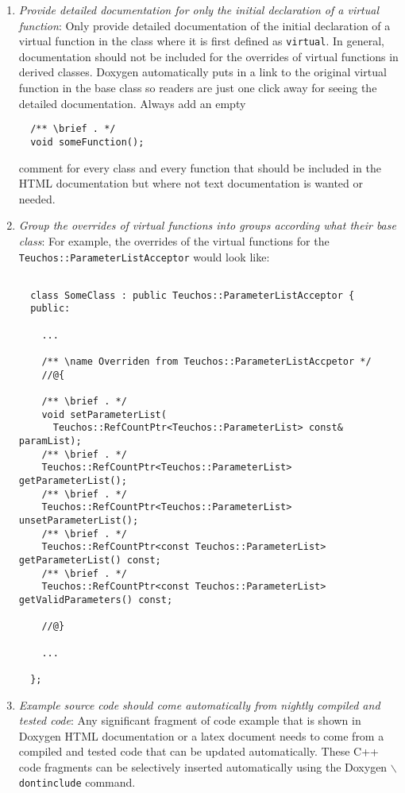 \begin{enumerate}
{}\item\textit{Provide detailed documentation for only the initial declaration
of a virtual function}: Only provide detailed documentation of the initial
declaration of a virtual function in the class where it is first defined as
{}\texttt{virtual}.  In general, documentation should not be included for the
overrides of virtual functions in derived classes.  Doxygen automatically puts
in a link to the original virtual function in the base class so readers are
just one click away for seeing the detailed documentation.  Always add an
empty
%
{\small\begin{verbatim}
  /** \brief . */
  void someFunction();
\end{verbatim}}
%
comment for every class and every function that should be included in the HTML
documentation but where not text documentation is wanted or needed.

{}\item\textit{Group the overrides of virtual functions into groups according
what their base class}: For example, the overrides of the virtual functions
for the {}\texttt{Teuchos\-::Parameter\-List\-Acceptor} would look like:

{\small\begin{verbatim}

  class SomeClass : public Teuchos::ParameterListAcceptor {
  public:

    ...

    /** \name Overriden from Teuchos::ParameterListAccpetor */
    //@{

    /** \brief . */
    void setParameterList(
      Teuchos::RefCountPtr<Teuchos::ParameterList> const& paramList);
    /** \brief . */
    Teuchos::RefCountPtr<Teuchos::ParameterList> getParameterList();
    /** \brief . */
    Teuchos::RefCountPtr<Teuchos::ParameterList> unsetParameterList();
    /** \brief . */
    Teuchos::RefCountPtr<const Teuchos::ParameterList> getParameterList() const;
    /** \brief . */
    Teuchos::RefCountPtr<const Teuchos::ParameterList> getValidParameters() const;

    //@}

    ...

  };

\end{verbatim}}

{}\item\textit{Example source code should come automatically from nightly
compiled and tested code}: Any significant fragment of code example that is
shown in Doxygen HTML documentation or a latex document needs to come from a
compiled and tested code that can be updated automatically.  These C++ code
fragments can be selectively inserted automatically using the Doxygen
{}\texttt{$\backslash$dontinclude} command.


\end{enumerate}
